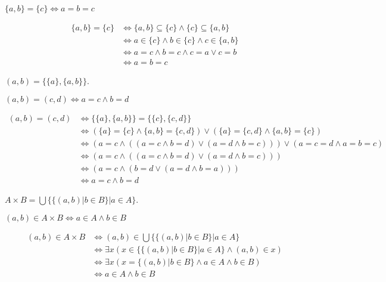 \begin{trditev}
    $\{a, b\} = \{c\} \iff a = b = c$
\end{trditev}
\begin{dokaz}
\begin{align*}
    \{a, b\} = \{c\} &\iff \{a, b\} \subseteq \{c\} \wedge \{c\} \subseteq \{a, b\} \\
    &\iff a \in \{c\} \wedge b \in \{c\} \wedge c \in \{a, b\} \\
    &\iff a = c \wedge b = c \wedge c = a \vee c = b \\
    &\iff a = b = c
\end{align*}
\end{dokaz}

\begin{definicija}
    $(a, b) = \{\{a\},\{a,b\}\}$.
\end{definicija}

\begin{trditev}
    $(a, b) = (c, d) \iff a = c \wedge b = d$
\end{trditev}
\begin{dokaz}
\begin{align*}
    (a, b) = (c, d) &\iff \{\{a\},\{a,b\}\} = \{\{c\},\{c,d\}\} \\
    &\iff (\{a\} = \{c\} \wedge \{a,b\} = \{c,d\}) \vee (\{a\} = \{c,d\} \wedge \{a,b\} = \{c\}) \\
    &\iff (a = c \wedge ((a = c \wedge b = d) \vee (a = d \wedge b = c))) \vee (a = c = d \wedge a = b = c) \\
    &\iff (a = c \wedge ((a = c \wedge b = d) \vee (a = d \wedge b = c))) \\
    &\iff (a = c \wedge (b = d \vee (a = d \wedge b = a))) \\
    &\iff a = c \wedge b = d
\end{align*}
\end{dokaz}

\begin{definicija}
    $A \times B = \bigcup\{\{(a,b) | b \in B\} | a \in A\}$.
\end{definicija}

\begin{trditev}
    $(a, b) \in A \times B \iff a \in A \wedge b \in B$
\end{trditev}
\begin{dokaz}
\begin{align*}
    (a, b) \in A \times B &\iff (a, b) \in \bigcup\{\{(a,b) | b \in B\} | a \in A\} \\
    &\iff \exists x (x \in \{\{(a,b) | b \in B\} | a \in A\} \wedge (a, b) \in x) \\
    &\iff \exists x (x = \{(a,b) | b \in B\} \wedge a \in A \wedge b \in B) \\
    &\iff a \in A \wedge b \in B
\end{align*}
\end{dokaz}
